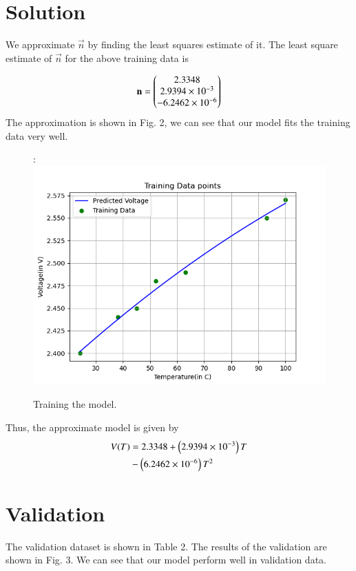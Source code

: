 \documentclass[journal,12pt,twocolumn]{IEEEtran}
\begin{document}
\section{Solution}
We approximate $\vec{n}$ by finding the least squares estimate of it. The least square estimate of $\vec{n}$ for the above training data is

\begin{align}
	\boldsymbol{\mathbf{n}} = \begin{pmatrix}2.3348\\2.9394\times10^{-3}\\-6.2462\times10^{-6}\end{pmatrix}
\end{align}
The approximation is shown in Fig. 2, we can see that our model fits the training data very well.
\begin{figure}[!ht]
    :\centering
    \includegraphics[width=\columnwidth]{figs/Training_Data.png}
    \caption{Training the model.}
    \label{fig:train}
\end{figure}
Thus, the approximate model is given by
\begin{align}
    V(T) &= 2.3348 + \left(2.9394\times10^{-3}\right)T \nonumber \\
         &- \left(6.2462\times10^{-6}\right)T^2
    \label{eq:opt-model}
\end{align}

\section{Validation}
The validation dataset is shown in Table 2. The results of the 
validation are shown in Fig. 3. We can see that our model perform well in validation data.
\end{document}
